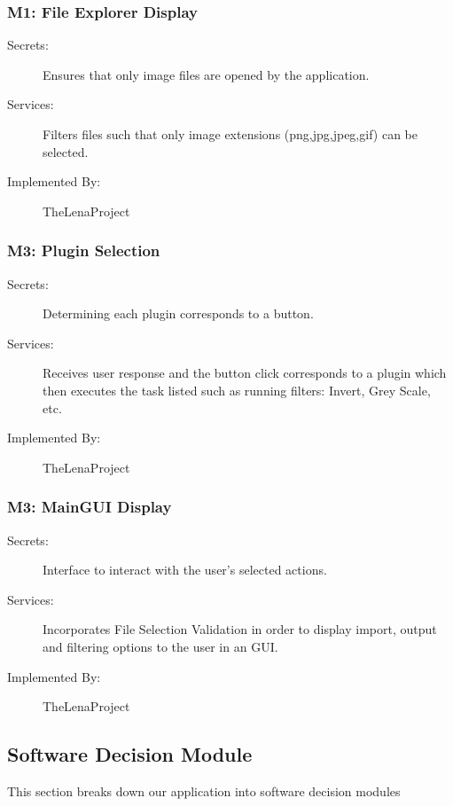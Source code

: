\documentclass[12pt, titlepage]{article}
\begin{document}
\subsubsection{M1: File Explorer Display}

\begin{description}
	\item[Secrets:]  Ensures that only image files are opened by the application.
	\item[Services:] Filters files such that only image extensions (png,jpg,jpeg,gif) can be selected. 
	\item[Implemented By:] TheLenaProject
	
\end{description}

\subsubsection{M3: Plugin Selection}

\begin{description}
	\item[Secrets:] Determining each plugin corresponds to a button.
	\item[Services:] Receives user response and the button click corresponds to a plugin which then executes the task listed such as running filters: Invert, Grey Scale, etc. 
	\item[Implemented By:] TheLenaProject
\end{description}

\subsubsection{M3: MainGUI Display}

\begin{description}
	\item[Secrets:] Interface to interact with the user's selected actions.
	\item[Services:] Incorporates File Selection Validation in order to display import, output and filtering options to the user in an GUI.
	\item[Implemented By:] TheLenaProject
\end{description}

\subsection{Software Decision Module}
This section breaks down our application into software decision modules
\end{document}
